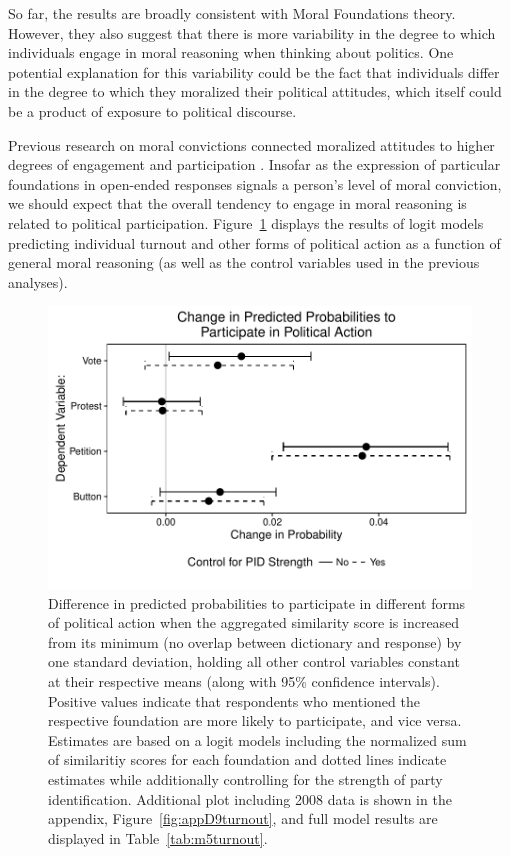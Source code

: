 \documentclass[12pt]{article}
\begin{document}
So far, the results are broadly consistent with Moral Foundations theory. However, they also suggest that there is more variability in the degree to which individuals engage in moral reasoning when thinking about politics. One potential explanation for this variability could be the fact that individuals differ in the degree to which they moralized their political attitudes, which itself could be a product of exposure to political discourse.

Previous research on moral convictions connected moralized attitudes to higher degrees of engagement and participation \citep{skitka2010psychology}. Insofar as the expression of particular foundations in open-ended responses signals a person's level of moral conviction, we should expect that the overall tendency to engage in moral reasoning is related to political participation. Figure~\ref{fig:5turnout} displays the results of logit models predicting individual turnout and other forms of political action as a function of general moral reasoning (as well as the control variables used in the previous analyses).

\begin{figure}[h]\centering
\includegraphics[scale=.9]{../calc/fig/fig5turnout.pdf}
\caption{Difference in predicted probabilities to participate in different forms of political action when the aggregated similarity score is increased from its minimum (no overlap between dictionary and response) by one standard deviation, holding all other control variables constant at their respective means (along with 95\% confidence intervals). Positive values indicate that respondents who mentioned the respective foundation are more likely to participate, and vice versa. Estimates are based on a logit models including the normalized sum of similaritiy scores for each foundation and dotted lines indicate estimates while additionally controlling for the strength of party identification. Additional plot including 2008 data is shown in the appendix, Figure~\ref{fig:appD9turnout}, and full model results are displayed in Table~\ref{tab:m5turnout}.}\label{fig:5turnout}
\end{figure}
\end{document}
